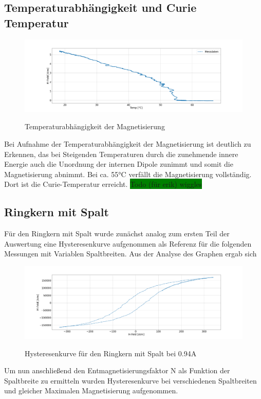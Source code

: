     \subsection{Temperaturabhängigkeit und Curie Temperatur}
        \begin{figure}[ht]
            \centering
            \includegraphics[width=\textwidth]{Images/Teil3.png}
            \label{Temp}
            \caption{Temperaturabhängigkeit der Magnetisierung}
        \end{figure}
        Bei Aufnahme der Temperaturabhängigkeit der Magnetisierung ist deutlich zu Erkennen, das bei Steigenden Temperaturen durch die zunehmende innere Energie
        auch die Unordnung der internen Dipole zunimmt und somit die Magnetisierung abnimmt. Bei ca. 55°C verfällt die Magnetisierung vollständig. Dort ist die Curie-Temperatur erreicht.
        \colorbox{green}{Todo (für erik) wiggles}
    \subsection{Ringkern mit Spalt}
        Für den Ringkern mit Spalt wurde zunächst analog zum ersten Teil der Auswertung eine Hysteresenkurve aufgenommen als Referenz für die folgenden Messungen mit Variablen Spaltbreiten.
        Aus der Analyse des Graphen ergab sich
        \begin{figure}[ht]
            \centering
            \includegraphics[width=\textwidth]{Images/Teil4.1.png}
            \label{Hyst4}
            \caption{Hysteresenkurve für den Ringkern mit Spalt bei 0.94A}
        \end{figure}
        Um nun anschließend den Entmagnetisierungsfaktor N als Funktion der Spaltbreite zu ermitteln wurden Hysteresenkurve bei verschiedenen Spaltbreiten und gleicher Maximalen Magnetisierung
        aufgenommen.